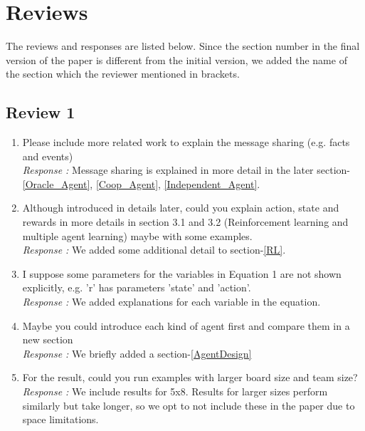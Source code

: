 \section{Reviews} The reviews and responses are listed below. Since the section number in the final version of the paper is different from the initial version, we added the name of the section which the reviewer mentioned in brackets.

\subsection{Review 1}
\begin{enumerate}
\item Please include more related work to explain the message sharing (e.g. facts and events)\\
{\it Response : }Message sharing is explained in more detail in the later section-\ref{Oracle_Agent}, \ref{Coop_Agent}, \ref{Independent_Agent}.

\item Although introduced in details later, could you explain action, state and rewards in more details in section 3.1 and 3.2 (Reinforcement learning and multiple agent learning) maybe with some examples.\\
{\it Response : }We added some additional detail to section-\ref{RL}.
\item I suppose some parameters for the variables in Equation 1 are not shown explicitly, e.g. 'r' has parameters 'state' and 'action'.\\
{\it Response : }We added explanations for each variable in the equation.
\item Maybe you could introduce each kind of agent first and compare them in a new section\\
{\it Response : }We briefly added a section-\ref{AgentDesign}
\item For the result, could you run examples with larger board size and team size?\\
{\it Response : }We include results for 5x8. Results for larger sizes perform similarly but take longer, so we opt to not include these in the paper due to space limitations.
\end{enumerate}

